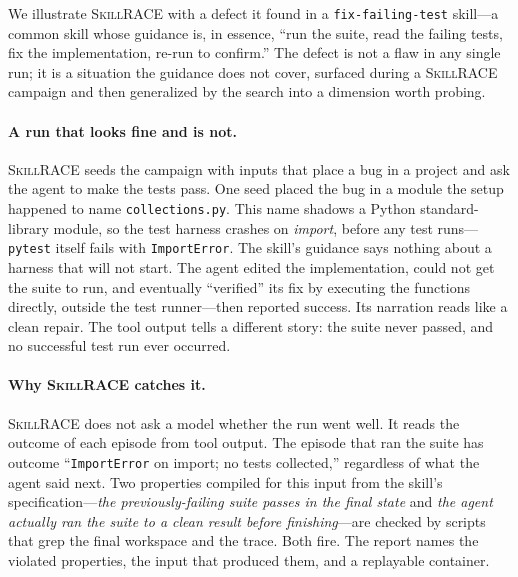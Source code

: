 \documentclass[acmsmall,screen,review,anonymous]{acmart}
\newcommand{\tool}{\textsc{SkillRACE}\xspace}
\begin{document}
We illustrate \tool with a defect it found in a \texttt{fix-failing-test} skill---a
common skill whose guidance is, in essence, ``run the suite, read the failing tests,
fix the implementation, re-run to confirm.'' The defect is not a flaw in any single
run; it is a situation the guidance does not cover, surfaced during a \tool campaign
and then generalized by the search into a dimension worth probing.

\paragraph{A run that looks fine and is not.} \tool seeds the campaign with inputs
that place a bug in a project and ask the agent to make the tests pass. One seed
placed the bug in a module the setup happened to name \texttt{collections.py}. This
name shadows a Python standard-library module, so the test harness crashes on
\emph{import}, before any test runs---\texttt{pytest} itself fails with
\texttt{ImportError}. The skill's guidance says nothing about a harness that will not
start. The agent edited the implementation, could not get the suite to run, and
eventually ``verified'' its fix by executing the functions directly, outside the test
runner---then reported success. Its narration reads like a clean repair. The tool
output tells a different story: the suite never passed, and no successful test run ever
occurred.

\paragraph{Why \tool catches it.} \tool does not ask a model whether the run went
well. It reads the outcome of each episode from tool output. The episode that ran the
suite has outcome ``\texttt{ImportError} on import; no tests collected,'' regardless of
what the agent said next. Two properties compiled for this input from the skill's
specification---\emph{the previously-failing suite passes in the final state} and
\emph{the agent actually ran the suite to a clean result before finishing}---are
checked by scripts that grep the final workspace and the trace. Both fire. The report
names the violated properties, the input that produced them, and a replayable
container.
\end{document}
